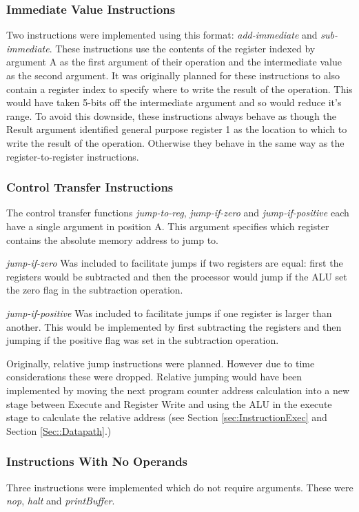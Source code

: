 \documentclass[11pt,a4paper]{IEEEtran}
\begin{document}
			\subsubsection{Immediate Value Instructions}
				Two instructions were implemented using this format: \textit{add-immediate} and \textit{sub-immediate}. These instructions use the contents of the register indexed by argument A as the first argument of their operation and the intermediate value as the second argument. It was originally planned for these instructions to also contain a register index to specify where to write the result of the operation. This would have taken 5-bits off the intermediate argument and so would reduce it's range. To avoid this downside, these instructions always behave as though the Result argument identified general purpose register 1 as the location to which to write the result of the operation. Otherwise they behave in the same way as the register-to-register instructions. 
			
			\subsubsection{Control Transfer Instructions}
			The control transfer functions \textit{jump-to-reg}, \textit{jump-if-zero} and \textit{jump-if-positive} each have a single argument in position A. This argument specifies which register contains the absolute memory address to jump to. 
			
			\textit{jump-if-zero} Was included to facilitate jumps if two registers are equal: first the registers would be subtracted and then the processor would jump if the ALU set the zero flag in the subtraction operation. 
			
			\textit{jump-if-positive} Was included to facilitate jumps if one register is larger than another. This would be implemented by first subtracting the registers and then jumping if the positive flag was set in the subtraction operation. 
			
			Originally, relative jump instructions were planned. However due to time considerations these were dropped. Relative jumping would have been implemented by moving the next program counter address calculation into a new stage between Execute and Register Write and using the ALU in the execute stage to calculate the relative address (see Section \ref{sec:InstructionExec} and Section \ref{Sec::Datapath}.) 
				
			\subsubsection{Instructions With No Operands}
				Three instructions were implemented which do not require arguments. These were \textit{nop}, \textit{halt} and \textit{printBuffer}.
				
\end{document}
